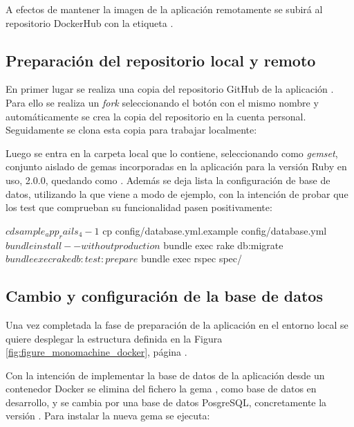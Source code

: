 A efectos de mantener la imagen de la aplicación remotamente se subirá al repositorio DockerHub con la etiqueta .

\subsection{Preparación del repositorio local y remoto}

En primer lugar se realiza una copia del repositorio GitHub de la aplicación . Para ello se realiza un \textit{fork} seleccionando el botón con el mismo nombre y automáticamente se crea la copia del repositorio en la cuenta personal. Seguidamente se clona esta copia para trabajar localmente:


Luego se entra en la carpeta local que lo contiene, seleccionando como \textit{gemset}, conjunto aislado de gemas incorporadas en la aplicación para la versión Ruby en uso, 2.0.0, quedando como . Además se deja lista la configuración de base de datos, utilizando la que viene a modo de ejemplo, con la intención de probar que los test que comprueban su funcionalidad pasen positivamente: 

\begin{code}
$ cd sample_app_rails_4-1
$ cp config/database.yml.example config/database.yml
$ bundle install --without production
$ bundle exec rake db:migrate
$ bundle exec rake db:test:prepare
$ bundle exec rspec spec/
\end{code}

\subsection{Cambio y configuración de la base de datos}

Una vez completada la fase de preparación de la aplicación en el entorno local se quiere desplegar la estructura definida en la Figura \ref{fig:figure_monomachine_docker}, página \pageref{fig:figure_monomachine_docker}.

Con la intención de implementar la base de datos de la aplicación desde un contenedor Docker se elimina del fichero  la gema , como base de datos en desarrollo, y se cambia por una base de datos PosgreSQL, concretamente la versión . Para instalar la nueva gema se ejecuta:

